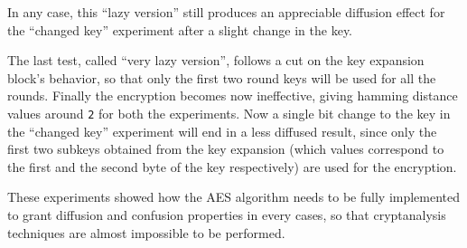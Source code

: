 \documentclass[12pt]{article}
\begin{document}
\begin{table}[h!]
    \centering
    \caption{Two results (in blocks) of the "changed plaintext" experiment ("lazy version")}
\end{table}

In any case, this ``lazy version'' still produces an appreciable diffusion effect for the ``changed key'' experiment after a slight change in the key.

The last test, called ``very lazy version'', follows a cut on the key expansion block's behavior, so that only the first two round keys will be used for all the rounds. 
Finally the encryption becomes now ineffective, giving hamming distance values around \verb|2| for both the experiments. 
Now a single bit change to the key in the ``changed key'' experiment will end in a less diffused result, since only the first two subkeys obtained from the key expansion (which values correspond to the first and the second byte of the key respectively) are used for the encryption.

These experiments showed how the AES algorithm needs to be fully implemented to grant diffusion and confusion properties in every cases, so that cryptanalysis techniques are almost impossible to be performed.

\begin{table}[h!]
    \centering
    \caption{Average hamming distance between ciphetexts}
\end{table}
\end{document}
